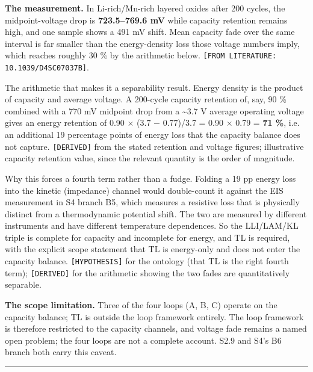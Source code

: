 \documentclass[11pt,a4paper]{article}
\begin{document}
\textbf{The measurement.} In Li-rich/Mn-rich layered oxides after 200 cycles, the midpoint-voltage drop is \textbf{723.5--769.6 mV} while capacity retention remains high, and one sample shows a 491 mV shift. Mean capacity fade over the same interval is far smaller than the energy-density loss those voltage numbers imply, which reaches roughly 30 \% by the arithmetic below. \texttt{[FROM LITERATU}\hspace{0pt}\texttt{RE: 10.1039/}\hspace{0pt}\texttt{D4SC07037B]}.


The arithmetic that makes it a separability result. Energy density is the product of capacity and average voltage. A 200-cycle capacity retention of, say, 90 \% combined with a 770 mV midpoint drop from a \textasciitilde{}3.7 V average operating voltage gives an energy retention of 0.90 \ensuremath{\times} (3.7 \ensuremath{-} 0.77)/3.7 = 0.90 \ensuremath{\times} 0.79 = \textbf{71 \%}, i.e. an additional 19 percentage points of energy loss that the capacity balance does not capture. \texttt{[DERIVED]} from the stated retention and voltage figures; illustrative capacity retention value, since the relevant quantity is the order of magnitude.


Why this forces a fourth term rather than a fudge. Folding a 19 pp energy loss into the kinetic (impedance) channel would double-count it against the EIS measurement in S4 branch B5, which measures a resistive loss that is physically distinct from a thermodynamic potential shift. The two are measured by different instruments and have different temperature dependences. So the LLI/LAM/KL triple is complete for capacity and incomplete for energy, and TL is required, with the explicit scope statement that TL is energy-only and does not enter the capacity balance. \texttt{[HYPOTHESIS]} for the ontology (that TL is the right fourth term); \texttt{[DERIVED]} for the arithmetic showing the two fades are quantitatively separable.


\textbf{The scope limitation.} Three of the four loops (A, B, C) operate on the capacity balance; TL is outside the loop framework entirely. The loop framework is therefore restricted to the capacity channels, and voltage fade remains a named open problem; the four loops are not a complete account. S2.9 and S4's B6 branch both carry this caveat.


\par\noindent\rule{\linewidth}{0.4pt}\par
\end{document}
